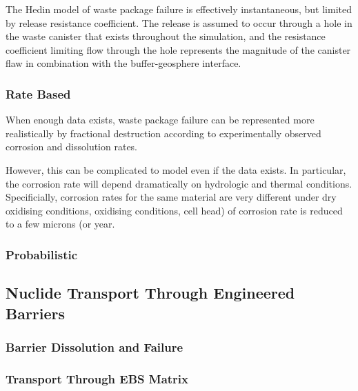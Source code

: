 The Hedin model of waste package failure is effectively instantaneous, but
limited by release resistance coefficient. The release is assumed  to occur
through a hole in the waste canister that exists throughout the simulation, and
the resistance coefficient limiting flow through the hole represents the
magnitude of the canister flaw in combination with the buffer-geosphere
interface.  \cite{hedin_integrated_2002}

\subsubsection{Rate Based} When enough data exists, waste package failure can
be represented more  realistically by fractional destruction according to
experimentally observed corrosion and dissolution rates. 

However, this can be complicated to model even if the data exists. In
particular, the corrosion rate will depend dramatically on hydrologic and
thermal conditions. Specificially, corrosion rates for the same material are
very different under dry oxidising conditions, %
oxidising conditions, %
cell head) of %
corrosion rate is reduced to a few microns (or %
year.  %

\subsubsection{Probabilistic}


\subsection{Nuclide Transport Through Engineered Barriers}

\subsubsection{Barrier Dissolution and Failure}

\subsubsection{Transport Through EBS Matrix}


